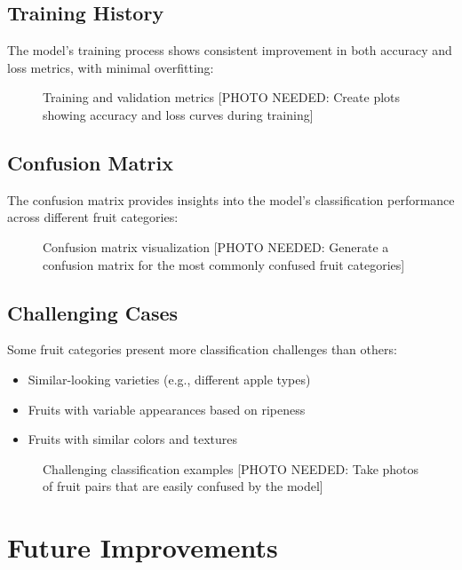 \documentclass[11pt,a4paper]{report}
\begin{document}
\section{Training History}
The model's training process shows consistent improvement in both accuracy and loss metrics, with minimal overfitting:

\begin{figure}[H]
    \centering
    \fbox{\rule{0pt}{8cm}\rule{12cm}{0pt}}
    \caption{Training and validation metrics [PHOTO NEEDED: Create plots showing accuracy and loss curves during training]}
    \label{fig:training_history}
\end{figure}

\section{Confusion Matrix}
The confusion matrix provides insights into the model's classification performance across different fruit categories:

\begin{figure}[H]
    \centering
    \fbox{\rule{0pt}{10cm}\rule{12cm}{0pt}}
    \caption{Confusion matrix visualization [PHOTO NEEDED: Generate a confusion matrix for the most commonly confused fruit categories]}
    \label{fig:confusion_matrix}
\end{figure}

\section{Challenging Cases}
Some fruit categories present more classification challenges than others:

\begin{itemize}
    \item Similar-looking varieties (e.g., different apple types)
    \item Fruits with variable appearances based on ripeness
    \item Fruits with similar colors and textures
\end{itemize}

\begin{figure}[H]
    \centering
    \fbox{\rule{0pt}{8cm}\rule{12cm}{0pt}}
    \caption{Challenging classification examples [PHOTO NEEDED: Take photos of fruit pairs that are easily confused by the model]}
    \label{fig:challenging_cases}
\end{figure}

\chapter{Future Improvements}
\end{document}
